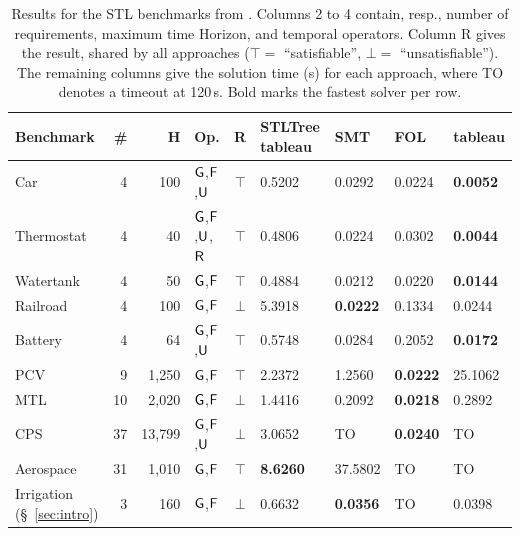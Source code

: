 \documentclass{easychair}
\begin{document}
\begin{table}
    \centering
    \caption{Results for the STL benchmarks from \cite{MelaniBC25}.
    Columns 2 to 4 contain, resp., number of requirements, maximum time Horizon, and temporal operators.
    Column R gives the result, shared by all approaches ($\top =$ ``satisfiable'', $\bot =$ ``unsatisfiable'').
    The remaining columns give the solution time (s) for each approach, where TO denotes a timeout at 120\,s. Bold marks the fastest solver per row.}
    \label{tab:stl-paper-bench}
    \footnotesize
    \begin{tabular}{l r r l c R{1.4cm} R{1.4cm} R{1.4cm} R{1.4cm}}
        \toprule
        \textbf{Benchmark} & \textbf{\#} & \textbf{H} & \textbf{Op.} & \textbf{R} & \textbf{STLTree tableau} & \textbf{\stlsat{} SMT} & \textbf{\stlsat{} FOL} & \textbf{\stlsat{} tableau} \\
        \midrule
        Car \cite{BaeLee19} & 4 & 100 & $\mathsf{G}$,$\mathsf{F}$,$\mathsf{U}$ & $\top$ & 0.5202 & 0.0292 & 0.0224 & \textbf{0.0052} \\
        Thermostat \cite{BaeLee19} & 4 & 40 & $\mathsf{G}$,$\mathsf{F}$,$\mathsf{U}$,$\mathsf{R}$ & $\top$ & 0.4806 & 0.0224 & 0.0302 & \textbf{0.0044} \\
        Watertank \cite{BaeLee19} & 4 & 50 & $\mathsf{G}$,$\mathsf{F}$ & $\top$ & 0.4884 & 0.0212 & 0.0220 & \textbf{0.0144} \\
        Railroad \cite{BaeLee19} & 4 & 100 & $\mathsf{G}$,$\mathsf{F}$ & $\bot$ & 5.3918 & \textbf{0.0222} & 0.1334 & 0.0244 \\
        Battery \cite{BaeLee19} & 4 & 64 & $\mathsf{G}$,$\mathsf{F}$,$\mathsf{U}$ & $\top$ & 0.5748 & 0.0284 & 0.2052 & \textbf{0.0172} \\
        PCV \cite{pcv} & 9 & 1,250 & $\mathsf{G}$,$\mathsf{F}$ & $\top$ & 2.2372 & 1.2560 & \textbf{0.0222} & 25.1062 \\
        MTL \cite{Benchmarks_Temporal_Logic_Requirements} & 10 & 2,020 & $\mathsf{G}$,$\mathsf{F}$ & $\bot$ & 1.4416 & 0.2092 & \textbf{0.0218} & 0.2892 \\
        CPS \cite{BoufaiedJBBP21} & 37 & 13,799 & $\mathsf{G}$,$\mathsf{F}$,$\mathsf{U}$ & $\bot$ & 3.0652 & TO & \textbf{0.0240} & TO \\
        Aerospace \cite{MelaniBC25} & 31 & 1,010 & $\mathsf{G}$,$\mathsf{F}$ & $\top$ & \textbf{8.6260} & 37.5802 & TO & TO \\
        Irrigation (\S~\ref{sec:intro}) & 3 & 160 & $\mathsf{G}$,$\mathsf{F}$ & $\bot$ & 0.6632 & \textbf{0.0356} & TO & 0.0398 \\
        \bottomrule
    \end{tabular}
\end{table}
\end{document}
